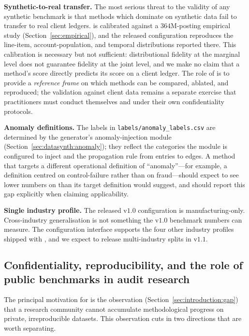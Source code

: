 \textbf{Synthetic-to-real transfer.}  The most serious threat to
the validity of any synthetic benchmark is that methods which
dominate on synthetic data fail to transfer to real client
ledgers.  \bench{} is calibrated against a $364$M-posting empirical
study (Section~\ref{sec:empirical}), and the released configuration
reproduces the line-item, account-population, and temporal
distributions reported there.  This calibration is necessary but
not sufficient: distributional fidelity at the marginal level does
not guarantee fidelity at the joint level, and we make no claim
that a method's \bench{} score directly predicts its score on a
client ledger.  The role of \bench{} is to provide a
\emph{reference frame} on which methods can be compared,
ablated, and reproduced; the validation against client data
remains a separate exercise that practitioners must conduct
themselves and under their own confidentiality protocols.

\textbf{Anomaly definitions.}  The labels in
\texttt{labels/anomaly\_labels.csv} are determined by the
generator's anomaly-injection module
(Section~\ref{sec:datasynth:anomaly}); they reflect the categories
the module is configured to inject and the propagation rule from
entries to edges.  A method that targets a different operational
definition of ``anomaly''---for example, a definition centred on
control-failure rather than on fraud---should expect to see lower
numbers on \bench{} than its target definition would suggest, and
should report this gap explicitly when claiming applicability.

\textbf{Single industry profile.}  The released v$1.0$ configuration
is manufacturing-only.  Cross-industry generalisation is not
something the v$1.0$ benchmark numbers can measure.  The
configuration interface supports the four other industry profiles
shipped with \system{}, and we expect to release multi-industry
splits in v$1.1$.

\subsection{Confidentiality, reproducibility, and the role of public
benchmarks in audit research}
\label{sec:discussion:reproducibility}

The principal motivation for \bench{} is the observation
(Section~\ref{sec:introduction:gap}) that a research community
cannot accumulate methodological progress on private,
irreproducible datasets.  This observation cuts in two directions
that are worth separating.

